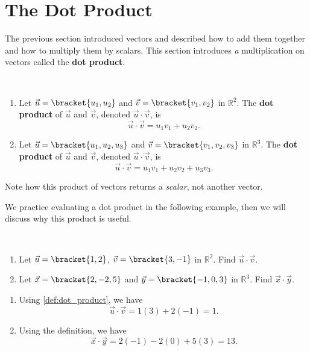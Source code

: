 \section{The Dot Product}\label{sec:dot_product}

The previous section introduced vectors and described how to add them together and how to multiply them by scalars. This section introduces \emph{a} multiplication on vectors called the \textbf{dot product}.

\begin{definition}\label{def:dot_product}
\mbox{}\\[-2\baselineskip]\parbox[t]{\linewidth}{\begin{enumerate}
	\item Let $\vec u =\bracket{u_1,u_2}$ and $\vec v = \bracket{v_1,v_2}$  in $\mathbb{R}^2$. The \textbf{dot product} of $\vec u$ and $\vec v$, denoted $\vec u\cdot\vec v$, is 
	\[\vec u\cdot\vec v = u_1v_1+u_2v_2.\]
	\item Let $\vec u = \bracket{u_1,u_2,u_3}$ and $\vec v = \bracket{v_1,v_2,v_3}$  in $\mathbb{R}^3$. The \textbf{dot product} of $\vec u$ and $\vec v$, denoted $\vec u\cdot \vec v$, is 
	\[\vec u\cdot\vec v = u_1v_1+u_2v_2+u_3v_3.\]
\end{enumerate}}
\end{definition}

Note how this product of vectors returns a \emph{scalar}, not another vector.

We practice evaluating a dot product in the following example, then we will discuss why this product is useful.

\begin{example}\label{ex_dotp1}
\mbox{}\\[-2\baselineskip]\parbox[t]{\linewidth}{%
\begin{enumerate}
	\item Let $\vec u=\bracket{1,2}$, $\vec v=\bracket{3,-1}$ in $\mathbb{R}^2$. Find $\vec u\cdot\vec v$.
	\item Let $\vec x = \bracket{2,-2,5}$ and $\vec y = \bracket{-1, 0, 3}$ in $\mathbb{R}^3$. Find $\vec x\cdot\vec y$.
\end{enumerate}}\vspace{0pt}
\solution
\begin{enumerate}
	\item Using \autoref{def:dot_product}, we have
	\[\vec u\cdot\vec v = 1(3)+2(-1) = 1.\]
	\item	Using the definition, we have
	\[\vec x\cdot\vec y = 2(-1)  -2(0) + 5(3) = 13.\]
\end{enumerate}
\end{example}

